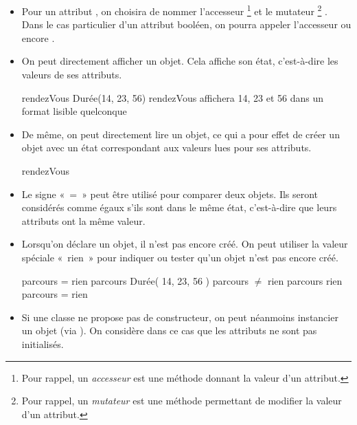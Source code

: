 	\begin{itemize}
		\item
			Pour un attribut ,
			on choisira de nommer l'accesseur%
			\footnote{%
				Pour rappel,
				un \emph{accesseur} est une méthode 
				donnant la valeur d'un attribut.
			} 
			et le mutateur%
			\footnote{%
				Pour rappel,
				un \emph{mutateur} est une méthode 
				permettant de modifier la valeur d'un attribut.
			} .
			Dans le cas particulier d'un attribut booléen,
			on pourra appeler l'accesseur  ou encore .
		\item
			On peut directement afficher un objet. 
			Cela affiche son état, c'est-à-dire les valeurs de ses attributs.

			\begin{LDA}
				\Let rendezVous \Gets {} Durée(14, 23, 56)
				\Write rendezVous 
				\RComment affichera 14, 23 et 56 dans un format lisible quelconque
			\end{LDA}
		\item
			De même, on peut directement lire un objet,
			ce qui a pour effet de créer un objet avec un état
			correspondant aux valeurs lues pour ses attributs.

			\begin{LDA}
				\Decl {rendezVous}{Durée}
				\Read rendezVous
			\end{LDA}
		\item 
			Le signe «~=~» peut être utilisé pour comparer deux objets.
			Ils seront considérés comme égaux s'ils sont dans le même état, 
			c'est-à-dire que leurs attributs ont la même valeur.
		\item
			Lorsqu'on déclare un objet, il n'est pas encore créé.
			On peut utiliser la valeur spéciale «~rien~»
			pour indiquer ou tester qu'un objet n'est pas encore créé.
			
			\begin{LDA}
												\RComment parcours = rien
				\Let parcours \Gets {} Durée( 14, 23, 56 )	\RComment parcours ${\neq}$ rien
				\If{parcours $\neq$ rien}
					\Let parcours \Gets rien						\RComment parcours = rien
				\EndIf
			\end{LDA}
		\item
			Si une classe ne propose pas de constructeur,
			on peut néanmoins instancier un objet 
			(via ).
			On considère dans ce cas que les attributs ne sont pas initialisés.
	\end{itemize}

